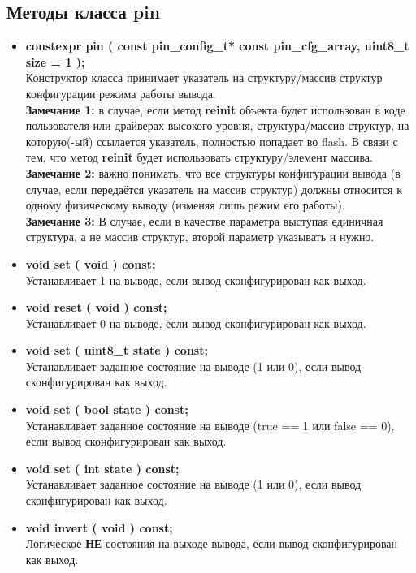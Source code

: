 \subsection{Методы класса pin}
\begin{itemize}
	\item \textbf{constexpr pin ( const pin\_config\_t* const pin\_cfg\_array,  uint8\_t size = 1 );}\\Конструктор класса принимает указатель на структуру/массив структур конфигурации режима работы  вывода.\\\textbf{Замечание 1: } в случае, если метод \textbf{reinit} объекта будет использован в коде пользователя или драйверах высокого уровня, структура/массив структур, на которую(-ый) ссылается указатель, полностью попадает во flash. В связи с тем, что метод \textbf{reinit} будет использовать структуру/элемент массива.
	\\\textbf{Замечание 2: }важно понимать, что все структуры конфигурации вывода (в случае, если передаётся указатель на массив структур) должны относится к одному физическому выводу (изменяя лишь режим его работы).
	\\\textbf{Замечание 3: }В случае, если в качестве параметра выступая единичная структура, а не массив структур, второй параметр указывать н нужно.
	\item \textbf{void	set		( void ) const;}\\Устанавливает 1 на выводе, если вывод сконфигурирован как выход.
	\item \textbf{void	reset	( void ) const;}\\Устанавливает 0 на выводе, если вывод сконфигурирован как выход.
	\item \textbf{void	set		( uint8\_t state ) const;}\\Устанавливает заданное состояние на выводе (1 или 0), если вывод сконфигурирован как выход.
	\item \textbf{void	set		( bool state ) const;}\\Устанавливает заданное состояние на выводе (true == 1 или false == 0), если вывод сконфигурирован как выход.
	\item \textbf{void	set		( int state ) const;}\\Устанавливает заданное состояние на выводе (1 или 0), если вывод сконфигурирован как выход.
	\item \textbf{void	invert	( void ) const;}\\Логическое \textbf{НЕ} состояния на выходе вывода, если вывод сконфигурирован как выход.

\end{itemize}
